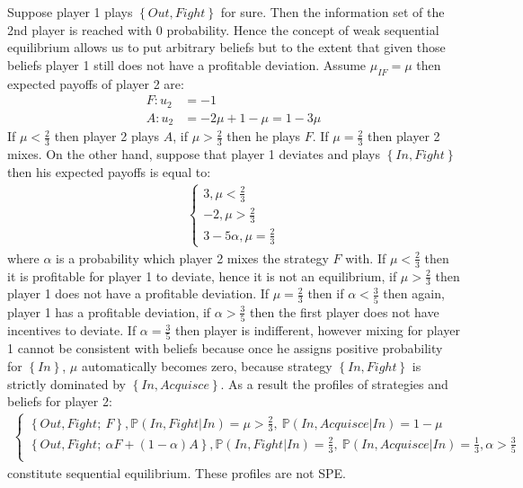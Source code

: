 \documentclass[a4paper]{article}
\newcommand{\prob}{\mathbb{P}}
\begin{document}
Suppose player 1 plays $\left\{Out, Fight\right\}$ for sure. Then the information set of the 2nd player is reached with 0 probability. Hence the concept of weak sequential equilibrium allows us to put arbitrary beliefs but to the extent that given those beliefs player 1 still does not have a profitable deviation. Assume $\mu_{IF} = \mu$ then expected payoffs of player 2 are:
\begin{align*}
F : u_2 &= -1\\
A: u_2 &=-2\mu + 1 - \mu = 1 - 3\mu
\end{align*}
If $\mu < \frac{2}{3}$ then player 2 plays $A$, if $\mu > \frac{2}{3}$ then he plays $F$. If $\mu = \frac{2}{3}$ then player 2 mixes. On the other hand, suppose that player 1 deviates and plays $\left\{In, Fight\right\}$ then his expected payoffs is equal to:
\begin{align*}
\begin{cases}
3, \mu < \frac{2}{3}\\
-2, \mu > \frac{2}{3}\\
3 - 5\alpha, \mu = \frac{2}{3}
\end{cases}
\end{align*}
where $\alpha$ is a probability which player 2 mixes the strategy $F$ with. If $\mu < \frac{2}{3}$ then it is profitable for player 1 to deviate, hence it is not an equilibrium, if $\mu > \frac{2}{3}$ then player 1 does not have a profitable deviation. If $\mu = \frac{2}{3}$ then if $\alpha < \frac{3}{5}$ then again, player 1 has a profitable deviation, if $\alpha > \frac{3}{5}$ then the first player does not have incentives to deviate. If $\alpha = \frac{3}{5}$ then player is indifferent, however mixing for player 1 cannot be consistent with beliefs because once he assigns positive probability for $\left\{In\right\}$, $\mu$ automatically becomes zero, because strategy $\left\{In, Fight\right\}$ is strictly dominated by $\left\{In, Acquisce\right\}$. As a result the profiles of strategies and beliefs for player 2:
\begin{align*}
\begin{cases}
\left\{Out, Fight;\ F \right\}, \prob(In, Fight|In) = \mu > \frac{2}{3},\ \prob(In, Acquisce|In) = 1 - \mu\\
\left\{Out, Fight;\ \alpha F + (1-\alpha)A \right\}, \prob(In, Fight|In) = \frac{2}{3},\ \prob(In, Acquisce|In) = \frac{1}{3}, \alpha > \frac{3}{5}\\
\end{cases}
\end{align*}
constitute sequential equilibrium. These profiles are not SPE.
\end{document}
